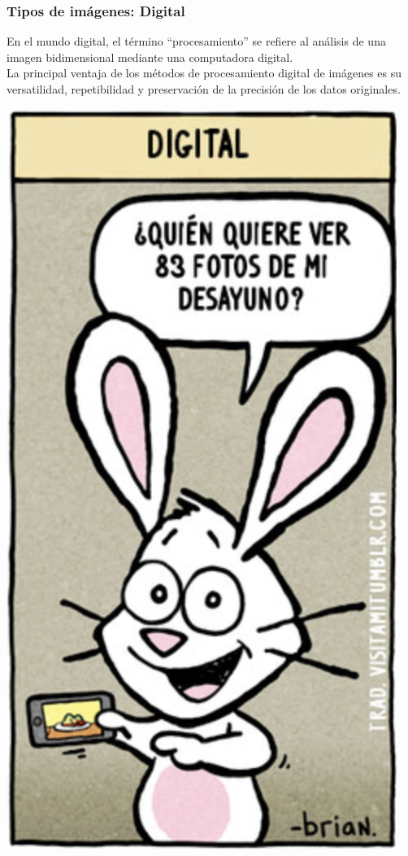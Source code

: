 \documentclass[
10pt, %
aspectratio=169, %
]{beamer}
\begin{document}
	\begin{frame}
		
		\frametitle{Tipos de imágenes: Digital}
		
		\noindent\begin{minipage}{.5\textwidth}
			
			En el mundo digital, el término ``procesamiento'' se refiere al análisis de una imagen bidimensional mediante una computadora digital. \\[2mm]
						
		   La principal ventaja de los métodos de procesamiento digital de imágenes es su versatilidad, repetibilidad y preservación de la precisión de los datos originales.
			
		\end{minipage}%
		\begin{minipage}{.55\textwidth}
			\centering
			\includegraphics[scale=0.43]{digital.png} 
			

\end{minipage}
\end{frame}
\end{document}
